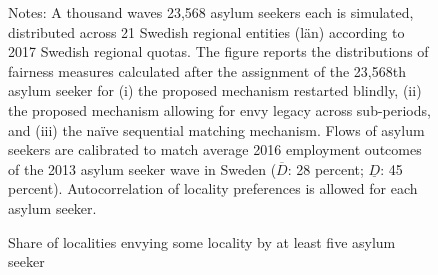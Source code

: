 \documentclass[12pt,fleqn]{article}
\begin{document}
\begin{figure}
	\caption{Share of localities envying some locality by at least five asylum seeker \label{FIG:quotas_fair1}}
	\begin{center}
	\end{center}
		{\scriptsize \vspace{-1em}
	\begin{singlespace}
		{\sc Notes:} A thousand waves 23,568 asylum seekers each is simulated, distributed across 21 Swedish regional entities (l\"{a}n) according to 2017 Swedish regional quotas. The figure reports the distributions of fairness measures calculated after the assignment of the 23,568th asylum seeker for (i) the proposed mechanism restarted blindly, (ii) the proposed mechanism allowing for envy legacy across sub-periods, and (iii) the na\"{i}ve sequential matching mechanism. Flows of asylum seekers are calibrated to match average 2016 employment outcomes of the 2013 asylum seeker wave in Sweden ($\overline{D}$: 28 percent; $\underline{D}$: 45 percent). Autocorrelation of locality preferences is allowed for each asylum seeker.
	\end{singlespace}
	 }
\end{figure}
\end{document}
